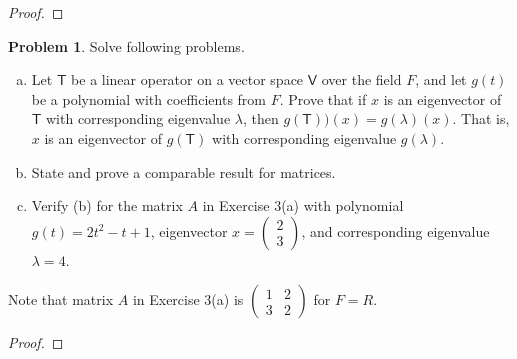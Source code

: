\documentclass[12pt]{book}
\theoremstyle{definition}
\newtheorem{problem}{Problem}
\begin{document}
	\begin{proof}
	\end{proof}
	\newpage
	\begin{problem}
		Solve following problems.
		\begin{enumerate}[(a)]
			\item Let $\mathsf{T}$ be a linear operator on a vector space $\mathsf{V}$ over the field $F$, and let $g(t)$ be a polynomial with coefficients from $F$. Prove that if $x$ is an eigenvector of $\mathsf{T}$ with corresponding eigenvalue $\lambda$, then $g(\mathsf{T}))(x)=g(\lambda)(x)$. That is, $x$ is an eigenvector of $g(\mathsf{T})$ with corresponding eigenvalue $g(\lambda)$.
			\item State and prove a comparable result for matrices.
			\item Verify (b) for the matrix $A$ in Exercise 3(a) with polynomial $g(t)=2t^2-t+1$, eigenvector $x=\begin{pmatrix}
				2\\3
			\end{pmatrix}$, and corresponding eigenvalue $\lambda=4$.
		\end{enumerate}
		Note that matrix $A$ in Exercise 3(a) is $\begin{pmatrix}
			1&2\\
			3&2
		\end{pmatrix}$ for $F=R$.
	\end{problem}
	\begin{proof}
	\end{proof}
\end{document}

